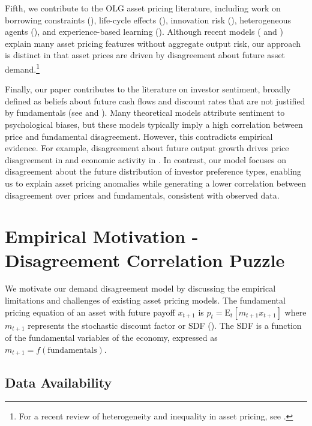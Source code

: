 \documentclass[preprint,11pt,authoryear]{elsarticle}
\theoremstyle{plain}
\begin{document}
Fifth, we contribute to the OLG asset pricing literature, including work on borrowing constraints (\cite{ConstantinidesDonaldsonMehra2002}), life-cycle effects (\cite{GOMES05}), innovation risk (\cite{GarlenauKoganPanageas2012}), heterogeneous agents (\cite{Garleanu2008}), and experience-based learning (\cite{EGH18}). Although recent models (\cite{GPcoordination:2021} and  \cite{GarlenauPanageas2023JPE}) explain many asset pricing features without aggregate output risk, our approach is distinct in that asset prices are driven by disagreement about future asset demand.\footnote{For a recent review of heterogeneity and inequality in asset pricing, see \cite{panageas:2020}.} 


Finally, our paper contributes to the literature on investor sentiment, broadly defined as beliefs about future cash flows and discount rates that are not justified by fundamentals (see \cite{BakerWurgler2007} and \cite{Zhou2018}). Many theoretical models attribute sentiment to psychological biases, but these models typically imply a high correlation between price and fundamental disagreement. However, this contradicts empirical evidence. For example, disagreement about future output growth drives price disagreement in \cite{Dumas2009} and economic activity in \cite{AngeletosLao2013}. In contrast, our model focuses on disagreement about the future distribution of investor preference types, enabling us to explain asset pricing anomalies while generating a lower correlation between disagreement over prices and fundamentals, consistent with observed data.


\section{Empirical Motivation - Disagreement Correlation Puzzle}\label{sec:empirics}

We motivate our demand disagreement model by discussing the empirical limitations and challenges of existing asset pricing models. The fundamental pricing equation of an asset with future payoff $x_{t+1}$ is $p_t = \mathrm{E}_t \left[ m_{t+1} x_{t+1} \right]$ 
where $m_{t+1}$ represents the stochastic discount factor or SDF (\cite{Cochrane2005}). The SDF is a function of the fundamental variables of the economy, expressed as $m_{t+1}  = f\left( \text{fundamentals}\right)$. 

\subsection{Data Availability}
\end{document}
